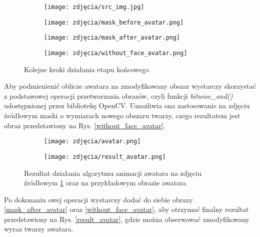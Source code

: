 \begin{figure}[h]
	\centering
	\begin{subfigure}{0.35\textwidth}
		\centering
		\texttt{[image: zdjęcia/src\_img.jpg]}
		\subcaption{\label{src_img}}
	\end{subfigure}
	\begin{subfigure}{0.35\textwidth}
		\centering
		\texttt{[image: zdjęcia/mask\_before\_avatar.png]}
		\subcaption{\label{mask_before_avatar}}
	\end{subfigure}
	\begin{subfigure}{0.35\textwidth}
		\centering
		\texttt{[image: zdjęcia/mask\_after\_avatar.png]}
		\subcaption{\label{mask_after_avatar}}
	\end{subfigure}
	\begin{subfigure}{0.35\textwidth}
		\centering
		\texttt{[image: zdjęcia/without\_face\_avatar.png]}
		\subcaption{\label{without_face_avatar}}
	\end{subfigure}
	
	\caption{\label{fig:masks}Kolejne kroki działania etapu końcowego}
\end{figure}

Aby podmienienić oblicze awatara na zmodyfikowany obszar wystarczy skorzystać z podstawowej operacji przetwarzania obrazów, czyli funkcji \textit{bitwise\_and()} udostępnionej przez bibliotekę OpenCV. Umożliwia ona zastosowanie na zdjęciu źródłowym maski o wymiarach nowego obszaru twarzy, czego rezultatem jest obraz przedstawiony na Rys. \ref{without_face_avatar}.

\begin{figure}[h]
	\centering
	\begin{subfigure}{0.35\textwidth}
		\centering
		\texttt{[image: zdjęcia/avatar.png]}
		\subcaption{\label{avatar}}
	\end{subfigure}
	\begin{subfigure}{0.35\textwidth}
		\centering
		\texttt{[image: zdjęcia/result\_avatar.png]}
		\subcaption{\label{result_avatar}}
	\end{subfigure}
	
	\caption{\label{fig:result}Rezultat działania algorytmu animacji awatara \protect{} na zdjęciu źródłowym \ref{fig:masks} \protect{} oraz na przykładowym obrazie awatara \protect{}}
\end{figure}

Po dokonaniu owej operacji wystarczy dodać do siebie obrazy \ref{mask_after_avatar} oraz \ref{without_face_avatar}, aby otrzymać finalny rezultat przedstawiony na Rys. \ref{result_avatar}, gdzie można obserwować zmodyfikowany wyraz twarzy awatara.

